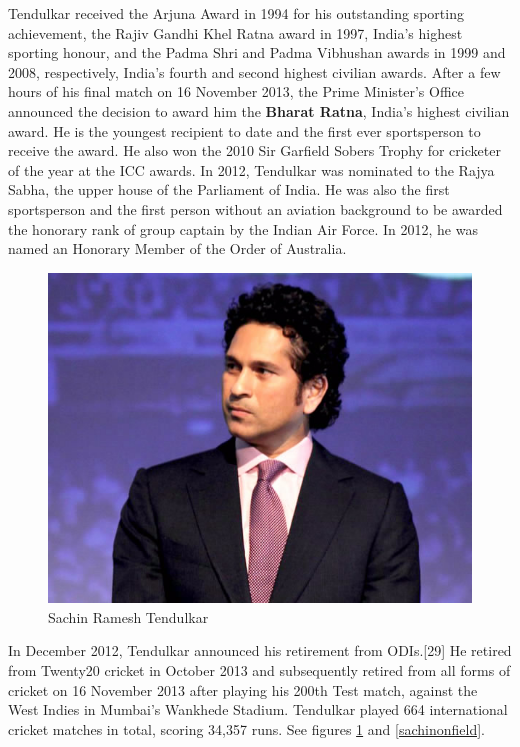 \documentclass{report}
\begin{document}
	Tendulkar received the Arjuna Award in 1994 for his outstanding sporting achievement, the Rajiv Gandhi Khel Ratna award in 1997, India's highest sporting honour, and the Padma Shri and Padma Vibhushan awards in 1999 and 2008, respectively, India's fourth and second highest civilian awards. After a few hours of his final match on 16 November 2013, the Prime Minister's Office announced the decision to award him the \textbf{Bharat Ratna}, India's highest civilian award. He is the youngest recipient to date and the first ever sportsperson to receive the award. He also won the 2010 Sir Garfield Sobers Trophy for cricketer of the year at the ICC awards. In 2012, Tendulkar was nominated to the Rajya Sabha, the upper house of the Parliament of India. He was also the first sportsperson and the first person without an aviation background to be awarded the honorary rank of group captain by the Indian Air Force. In 2012, he was named an Honorary Member of the Order of Australia.
		\begin{figure}[h]
		\begin{center}
			\includegraphics[scale=0.2]{Sachin-01.jpg}
		\end{center}		
		\caption{Sachin Ramesh Tendulkar}
		\label{sachinintro}
	\end{figure}
	 In December 2012, Tendulkar announced his retirement from ODIs.[29] He retired from Twenty20 cricket in October 2013 and subsequently retired from all forms of cricket on 16 November 2013 after playing his 200th Test match, against the West Indies in Mumbai's Wankhede Stadium. Tendulkar played 664 international cricket matches in total, scoring 34,357 runs. See figures \ref{sachinintro} and \ref{sachinonfield}.
	
\end{document}
